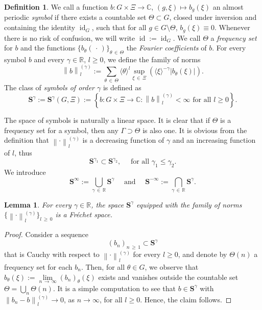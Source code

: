 \documentclass[10pt]{amsart}
\newtheorem{lemm}[theo]{Lemma}\newtheorem{prop}[theo]{Proposition}\newtheorem{coro}[theo]{Corollary}\newtheorem{conj}[theo]{Conjecture}
\theoremstyle{definition}\newtheorem{defi}[theo]{Definition}\newtheorem{rema}[theo]{Remark}\newtheorem{exam}[theo]{Example}\newtheorem{nota}[theo]{Notation}
\DeclareMathOperator{\id}{id}
\newcommand{\R}{\mathbb R}
\newcommand{\C}{\mathbb C}
\newcommand{\BS}{\mathbf S}
\renewcommand{\subseteq}{\subset}
\newcommand{\set}[1]{\left\{ #1 \right\}}
\newcommand{\snorm}[3]{\left\| #1\right\|_{#3}^{(#2)}}
\newcommand{\ang}[1]{\langle #1 \rangle}
\begin{document}
\begin{defi}
We call a function $b : G \times \Xi \to \C$, $(g,\xi) \mapsto b_g(\xi)$ an almost periodic
\emph{symbol} if there exists a countable set $\Theta \subset G$, closed under inversion and containing the identity $\id_G$, such that for all $g \in G \setminus
\Theta$, $b_g(\xi) \equiv 0$. Whenever there is no risk of confusion, we will write $\id := \id_G$. We call $\Theta$ a \emph{frequency set} for $b$ and the functions $\{b_\theta(\,\cdot\,)\}_{\theta\,\in\,\Theta}$ the \emph{Fourier coefficients} of $b$. For every symbol $b$ and every $\gamma\in\R$, $l\geq 0$, we define the family of norms
\begin{equation}\label{eq:defsnorm}
\snorm{b}{\gamma}{l} := \sum_{\theta\,\in\, \Theta} \ang \theta^l
\sup_{\xi\,\in\,\Xi} \left(\ang{\xi}^{-\gamma}
\left|b_\theta(\xi)\right|\right).
\end{equation}
The class of \emph{symbols of order $\gamma$} is defined as
\begin{equation}\label{eq:sgamma}
\BS^{\gamma}:=\BS^{\gamma}(G,\Xi):=\set{ b:G\times\Xi\to\C :
\snorm{b}{\gamma}{l}<\infty \text{ for all } l\geq 0}.
\end{equation}
\end{defi}

The space of symbols is naturally a linear space. It is clear that if $\Theta$ is a frequency set for a symbol, then any $\Gamma \supset \Theta$ is also one. It is obvious from the definition that $\snorm{\cdot}{\gamma}{l}$ is a decreasing function of $\gamma$ and an increasing function of $l$, thus
\begin{equation}
\BS^{\gamma_1}\subseteq\BS^{\gamma_2},\quad \text{ for all }\gamma_1\leq \gamma_2.
\end{equation}
We introduce
\begin{equation}\label{eq:algebradef}
\BS^\infty:= \bigcup_{\gamma\, \in\,\R} \BS^\gamma \quad \text{ and }
\quad \BS^{-\infty}:= \bigcap_{\gamma\,\in \,\R} \BS^\gamma.
\end{equation}

\begin{lemm}\label{lem:complete}
For every $\gamma\in\R$, the space $\BS^\gamma$ equipped with the family of norms $\lbrace\snorm{\cdot}{\gamma}{l}\rbrace_{l\,\geq\,0}$ is a Fréchet space.
\end{lemm}


\begin{proof}
Consider a sequence
\begin{equation}
(b_n)_{n\,\geq\,1}\subset \BS^\gamma
\end{equation}
that is Cauchy with respect to $\snorm{\cdot}{\gamma}{l}$ for every $l \geq 0$, and denote by $\Theta(n)$ a frequency set for each $b_n$. Then, for all $\theta \in G$, we observe that $b_\theta(\xi):=\lim\limits_{n\,\to\,\infty}(b_n)_\theta(\xi)$ exists and vanishes outside the countable set $\Theta = \bigcup_n \Theta(n)$. It is a simple computation to see that $b\in\BS^\gamma$ with $\snorm{b_n-b}{\gamma}{l}\to 0$, as $n\to\infty$, for all $l\geq 0$. Hence, the claim follows.
\end{proof}
\end{document}
